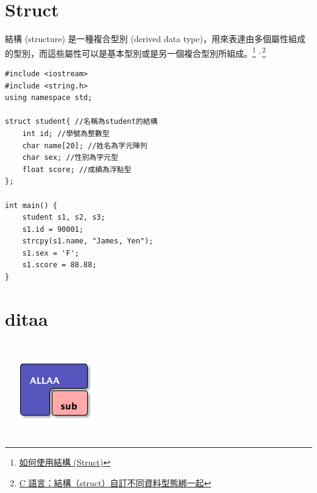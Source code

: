 \documentclass[12pt,a4paper]{article}
\begin{document}
\section{Struct}
\label{cpp_struct}
結構 (structure) 是一種複合型別 (derived data type)，用來表達由多個屬性組成的型別，而這些屬性可以是基本型別或是另一個複合型別所組成。\footnote{\href{https://michaelchen.tech/c-programming/struct/}{如何使用結構 (Struct)}} \textsuperscript{,}\,\footnote{\href{https://kopu.chat/2017/05/30/c-\%E8\%AA\%9E\%E8\%A8\%80\%EF\%BC\%9A\%E7\%B5\%90\%E6\%A7\%8B\%EF\%BC\%88struct\%EF\%BC\%89\%E8\%87\%AA\%E8\%A8\%82\%E4\%B8\%8D\%E5\%90\%8C\%E8\%B3\%87\%E6\%96\%99\%E5\%9E\%8B\%E6\%85\%8B\%E7\%B6\%81\%E4\%B8\%80\%E8\%B5\%B7/}{C 語言：結構（struct）自訂不同資料型態綁一起}}
\lstset{breaklines=true,language=cpp,label= ,caption= ,captionpos=b,firstnumber=1,numbers=left}
\begin{lstlisting}
#include <iostream>
#include <string.h>
using namespace std;

struct student{ //名稱為student的結構
    int id; //學號為整數型
    char name[20]; //姓名為字元陣列
    char sex; //性別為字元型
    float score; //成績為浮點型
};

int main() {
    student s1, s2, s3;
    s1.id = 90001;
    strcpy(s1.name, "James, Yen");
    s1.sex = 'F';
    s1.score = 88.88;
}

\end{lstlisting}

\section{ditaa}
\label{sec:org96b4c24}
\begin{center}
\includegraphics[width=.9\linewidth]{blue.png}
\end{center}
\end{document}
